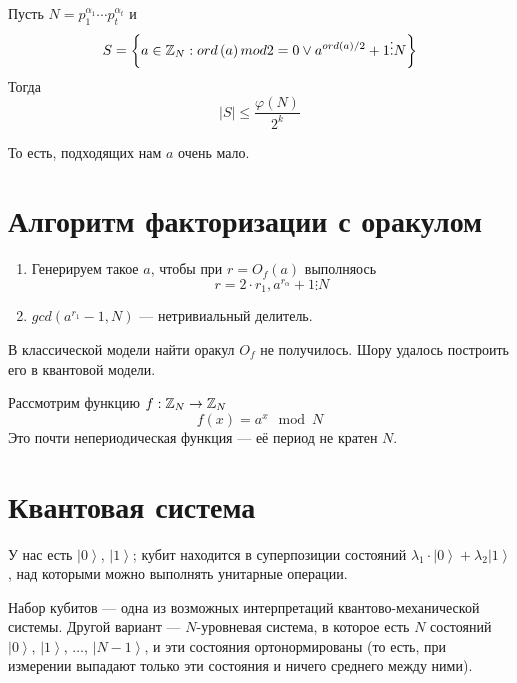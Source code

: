 \begin{affirmation}
  Пусть $N = p_{1}^{\alpha_{1}} \cdots p_{t}^{\alpha_{t}}$ и
  \begin{equation*}
    S = \left\{ a \in \mathbb{Z}_{N}: ord\left( a \right) mod 2 = 0
    \lor a^{ord\left( a \right)/2} + 1 \vdots N \right\}
  \end{equation*}
  Тогда
  \begin{equation*}
    \left| S \right| \le \frac{\varphi\left( N \right)}{2^k}
  \end{equation*}
\end{affirmation}

То есть, подходящих нам $a$ очень мало.

\section{Алгоритм факторизации с оракулом}

\begin{enumerate}
  \item Генерируем такое $a$, чтобы при $r = O_{f}\left( a \right)$ выполняось
    \begin{equation*}
      r = 2 \cdot r_1, a^{r_{\alpha}} + 1 \vdots N
    \end{equation*}
  \item $gcd\left( a^{r_1} - 1, N \right)$ --- нетривиальный делитель.
\end{enumerate}

\begin{affirmation}
  В классической модели найти оракул $O_f$ не получилось.
  Шору удалось построить его в квантовой модели.
\end{affirmation}

Рассмотрим функцию $f: \mathbb{Z}_{N} \rightarrow \mathbb{Z}_{N}$
\begin{equation*}
  f\left( x \right) = a^{x} \mod N
\end{equation*}
Это почти непериодическая функция --- её период не кратен $N$.

\section{Квантовая система}

У нас есть $\left| 0 \right>$, $\left| 1 \right>$; кубит находится в
суперпозиции состояний
$\lambda_1 \cdot \left| 0 \right> + \lambda_2 \left| 1 \right>$, над которыми
можно выполнять унитарные операции.

Набор кубитов --- одна из возможных интерпретаций квантово-механической системы.
Другой вариант --- $N$-уровневая система, в которое есть $N$ состояний
$\left| 0 \right>$, $\left| 1 \right>$, $\dots$, $\left| N-1 \right>$, и
эти состояния ортонормированы (то есть, при измерении выпадают только эти
состояния и ничего среднего между ними).
